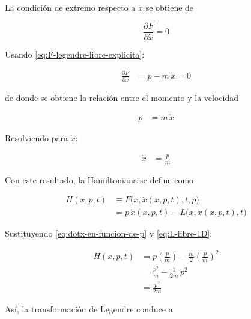 \documentclass{article}
\begin{document}
La condición de extremo respecto a $\dot{x}$ se obtiene de

\[
\frac{\partial F}{\partial \dot{x}} = 0
\]

Usando \eqref{eq:F-legendre-libre-explicita}:

\begin{equation}
\begin{split}
\frac{\partial F}{\partial \dot{x}} &= p - m\,\dot{x} = 0
\end{split}
\label{eq:derivada-F-libre}
\end{equation}

de donde se obtiene la relación entre el momento y la velocidad

\begin{equation}
\begin{split}
p &= m\,\dot{x}
\end{split}
\label{eq:p-m-dotx}
\end{equation}

Resolviendo para $\dot{x}$:

\begin{equation}
\begin{split}
\dot{x} &= \frac{p}{m}
\end{split}
\label{eq:dotx-en-funcion-de-p}
\end{equation}

Con este resultado, la Hamiltoniana se define como

\begin{equation}
\begin{split}
H(x,p,t)
&\equiv F\bigl(x,\dot{x}(x,p,t),t,p\bigr) \\
&= p\,\dot{x}(x,p,t) - L\bigl(x,\dot{x}(x,p,t),t\bigr)
\end{split}
\label{eq:H-def-libre}
\end{equation}

Sustituyendo \eqref{eq:dotx-en-funcion-de-p} y \eqref{eq:L-libre-1D}:

\begin{equation}
\begin{split}
H(x,p,t)
&= p\left(\frac{p}{m}\right)
 - \frac{m}{2}\left(\frac{p}{m}\right)^{2} \\[4pt]
&= \frac{p^{2}}{m} - \frac{1}{2m}\,p^{2} \\[4pt]
&= \frac{p^{2}}{2m}
\end{split}
\label{eq:H-libre-final}
\end{equation}

Así, la transformación de Legendre conduce a
\end{document}

